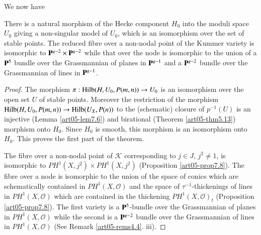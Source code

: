 We now have

\setcounter{theorem}{13}
\begin{theorem}\label{art05-thm8.14}
There is a natural morphism of the Hecke component $H_{0}$ into the
moduli space $U_{0}$ giving a non-singular model of $U_{0}$, which is
an isomorphism over the set of stable points. The reduced fibre over
a non-nodal point of the Kummer variety is isomorphic to
$\mathbf{P}^{g-2}\times \mathbf{P}^{g-2}$ while that over the node is isomorphic
to the union of a $\mathbf{P}^{5}$ bundle over the Grassmannian of planes in
$\mathbf{P}^{g-1}$ and a $\mathbf{P}^{g-2}$ bundle over the Grassmannian of lines
in $\mathbf{P}^{g-1}$. 
\end{theorem}

\begin{proof}
The morphism $\pi:\operatorname{Hilb}(H,U_{0},P(m,n))\to U_{0}$ is an isomorphism
over the open set $U$ of stable points. Moreover the restriction of
the morphism $\operatorname{Hilb}(H,U_{0},P(m,n))\to \operatorname{Hilb}(U_{X},P(n))$ to the
(schematic) closure of $p^{-1}(U)$ is an injective
(Lemma \ref{art05-lem7.6}) and birational
(Theorem \ref{art05-thm5.13}) morphism onto $H_{0}$. Since $H_{0}$ is
smooth, this morphism is an isomorphism onto $H_{0}$. This proves the
first part of the theorem.

The fibre over a non-nodal point of $\mathscr{K}$ corresponding to
$j\in J$, $j^{2}\neq 1$, is isomorphic to $PH^{1}(X,j^{2})\times
PH^{1}(X,j^{2})$ (Proposition \ref{art05-prop7.8}). The fibre over a
node is isomorphic to the union of the space of conics which are
schematically contained in $PH^{1}(X,\mathscr{O})$ and the space of
$\tau^{-1}$-thickenings of lines in $PH^{1}(X,\mathscr{O})$ which are
contained in the thickening $PH^{1}(X,\mathscr{O})_{t}$
(Proposition \ref{art05-prop7.8}). The first variety is a
$\mathbf{P}^{5}$-bundle over the Grassmannian of planes in
$PH^{1}(X,\mathscr{O})$ while the second is a $\mathbf{P}^{g-2}$ bundle over
the Grassmannian of lines in $PH^{1}(X,\mathscr{O})$ (See
Remark \ref{art05-rems4.4}. iii).
\end{proof}

